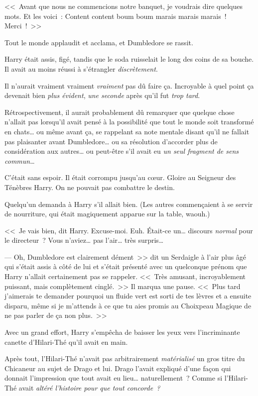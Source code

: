 <<~Avant que nous ne commencions notre banquet, je voudrais dire quelques mots. Et les voici~: Content content boum boum marais marais marais~! Merci~!~>>

Tout le monde applaudit et acclama, et Dumbledore se rassit.

Harry était assis, figé, tandis que le soda ruisselait le long des coins de sa bouche. Il avait au moins réussi à s'étrangler \emph{discrètement}.

Il n'aurait vraiment vraiment \emph{vraiment} pas dû faire ça. Incroyable à quel point ça devenait bien \emph{plus évident}, \emph{une seconde} après qu'il fut \emph{trop tard}.

Rétrospectivement, il aurait probablement dû remarquer que quelque chose n'allait pas lorsqu'il avait pensé à la possibilité que tout le monde soit transformé en chats… ou même avant ça, se rappelant sa note mentale disant qu'il ne fallait pas plaisanter avant Dumbledore… ou sa résolution d'accorder plus de considération aux autres… ou peut-être s'il avait eu \emph{un seul fragment de sens commun}…

C'était sans espoir. Il était corrompu jusqu'au cœur. Gloire au Seigneur des Ténèbres Harry. On ne pouvait pas combattre le destin.

Quelqu'un demanda à Harry s'il allait bien. (Les autres commençaient à se servir de nourriture, qui était magiquement apparue sur la table, waouh.)

<<~Je vais bien, dit Harry. Excuse-moi. Euh. Était-ce un… discours \emph{normal} pour le directeur~? Vous n'aviez… pas l'air… très surpris…

--- Oh, Dumbledore est clairement dément~>> dit un Serdaigle à l'air plus âgé qui s'était assis à côté de lui et s'était présenté avec un quelconque prénom que Harry n'allait certainement pas se rappeler. <<~Très amusant, incroyablement puissant, mais complètement cinglé.~>> Il marqua une pause. <<~Plus tard j'aimerais te demander pourquoi un fluide vert est sorti de tes lèvres et a ensuite disparu, même si je m'attends à ce que tu aies promis au Choixpeau Magique de ne pas parler de ça non plus.~>>

Avec un grand effort, Harry s'empêcha de baisser les yeux vers l'incriminante canette d'Hilari-Thé qu'il avait en main.

Après tout, l'Hilari-Thé n'avait pas arbitrairement \emph{matérialisé} un gros titre du Chicaneur au sujet de Drago et lui. Drago l'avait expliqué d'une façon qui donnait l'impression que tout avait eu lieu… naturellement~? Comme si l'Hilari-Thé avait \emph{altéré l'histoire pour que tout concorde~?}

